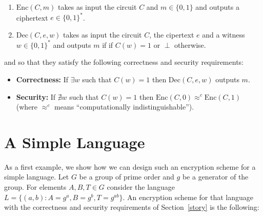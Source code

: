 \begin{enumerate}
\item $\mathrm{Enc}(C,m)$ takes as input the circuit $C$ and $m \in \{0,1\}$ and outputs a ciphertext $e \in \{0,1\}^{*}$.

\item $\mathrm{Dec}(C,e,w)$ takes as input the circuit $C$, the cipertext $e$ and a witness $w \in \{0,1\}^{*}$ and outputs $m$ if if $C(w) = 1$ or $\perp$ otherwise.
\end{enumerate}

and so that they satisfy the following correctness and security requirements:

\begin{itemize}

\item \textbf{Correctness:} If $\exists w$ such that $C(w) = 1$ then $\mathrm{Dec}(C,e,w)$ outputs $m$.

\item \textbf{Security:} If $\nexists w$ such that $C(w) = 1$ then $\mathrm{Enc}(C,0)   \approx^{c} \mathrm{Enc}(C,1) \!\ $ (where $ \approx^{c}$ means  ``computationally indistinguishable'').

\end{itemize}

\newpage

\section{A Simple Language }

As a first example, we show how we can design such an encryption scheme for a simple language. Let $G$ be a group of prime order and  $g$ be a generator of the group. For elements $A, B, T \in G$ consider the language $L = \{(a,b): A = g^a, B = g^b, T = g^{ab} \}$. An encryption scheme for that language with the correctness and security requirements of Section~\ref{story} is the following:

\smallskip

